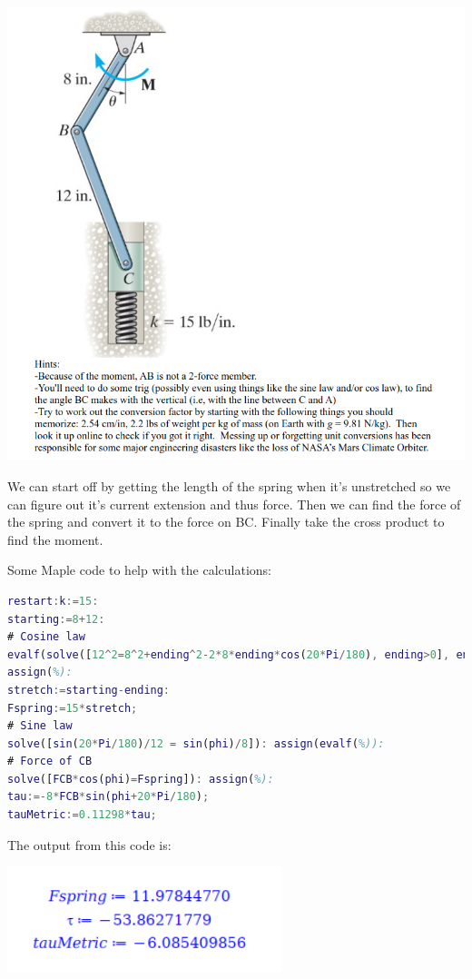 \documentclass{article}[14pt, letterpaper, Times New Roman]
\begin{document}
\includegraphics[width=15cm]{l10-pbq2.png}

We can start off by getting the length of the spring when it's unstretched so we can figure out it's current extension and thus force.
Then we can find the force of the spring and convert it to the force on BC.
Finally take the cross product to find the moment.

Some Maple code to help with the calculations:

\begin{lstlisting}[language=matlab]
restart:k:=15:
starting:=8+12:
# Cosine law
evalf(solve([12^2=8^2+ending^2-2*8*ending*cos(20*Pi/180), ending>0], ending)):
assign(%):
stretch:=starting-ending:
Fspring:=15*stretch;
# Sine law
solve([sin(20*Pi/180)/12 = sin(phi)/8]): assign(evalf(%)):
# Force of CB
solve([FCB*cos(phi)=Fspring]): assign(%):
tau:=-8*FCB*sin(phi+20*Pi/180);
tauMetric:=0.11298*tau;
\end{lstlisting}

The output from this code is:

\includegraphics[width=8cm]{l10-pbq-o.png}
\end{document}
